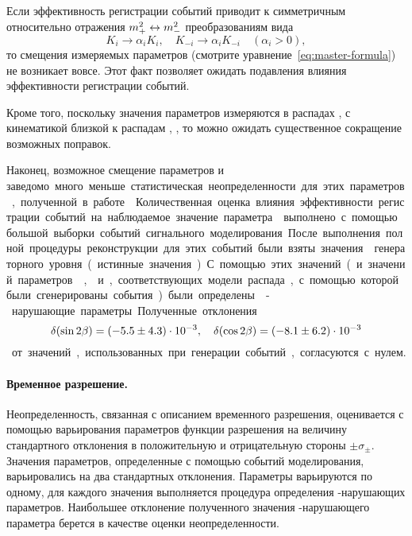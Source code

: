 Если эффективность регистрации событий приводит к симметричным относительно отражения $m_+^2\leftrightarrow m_-^2$ преобразованиям вида
\begin{equation}
  K_i\to\alpha_i K_i,\quad K_{-i}\to\alpha_i K_{-i}\quad (\alpha_i>0),
\end{equation}
то смещения измеряемых параметров (смотрите уравнение~\eqref{eq:master-formula}) не возникает вовсе.  Этот факт позволяет ожидать подавления влияния эффективности регистрации событий.

Кроме того, поскольку значения параметров \ki измеряются в распадах \bpdpi, \dbkpp с кинематикой близкой к распадам \bdsth, \dbkpp, то можно ожидать существенное сокращение возможных поправок.

Наконец, возможное смещение параметров \ci и \si заведомо много меньше статистическая неопределенности для этих параметров, полученной в работе~\cite{CLEO_phases}.

Количественная оценка влияния эффективности регистрации событий на наблюдаемое значение параметра \pphi выполнено с помощью большой выборки событий сигнального моделирования.  После выполнения полной процедуры реконструкции для этих событий были взяты значения \dt генераторного уровня (истинные значения).  С помощью этих значений (и значений параметров \ki, \ci и \si, соответствующих модели распада, с помощью которой были сгенерированы события) были определены \cpconj-нарушающие параметры.  Полученные отклонения
\begin{equation}\label{eq:gen_offsets}
 \delta(\sin{2\ensuremath{\beta}}) = (-5.5 \pm 4.3)\cdot 10^{-3},\quad\delta(\cos{2\ensuremath{\beta}}) = (-8.1 \pm 6.2)\cdot 10^{-3}
\end{equation}
от значений, использованных при генерации событий, согласуются с нулем.

\paragraph{Временное разрешение. }%
Неопределенность, связанная с описанием временного разрешения, оценивается с помощью варьирования параметров функции разрешения на величину стандартного отклонения в положительную и отрицательную стороны $\pm\sigma_{\pm}$.  Значения параметров, определенные с помощью событий моделирования, варьировались на два стандартных отклонения.  Параметры варьируются по одному, для каждого значения выполняется процедура определения \cpconj-нарушающих параметров.  Наибольшее отклонение полученного значения \cpconj-нарушающего параметра берется в качестве оценки неопределенности.  

